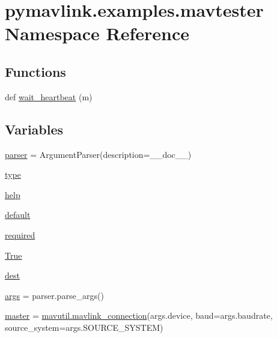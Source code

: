 \hypertarget{namespacepymavlink_1_1examples_1_1mavtester}{}\section{pymavlink.\+examples.\+mavtester Namespace Reference}
\label{namespacepymavlink_1_1examples_1_1mavtester}
\subsection*{Functions}
\begin{DoxyCompactItemize}
\item 
def \mbox{\hyperlink{namespacepymavlink_1_1examples_1_1mavtester_ae1bf609bf03b42c2ed744e90dbb30db3}{wait\+\_\+heartbeat}} (m)
\end{DoxyCompactItemize}
\subsection*{Variables}
\begin{DoxyCompactItemize}
\item 
\mbox{\hyperlink{namespacepymavlink_1_1examples_1_1mavtester_abaf020d3f161e1f0172b14362f3d36f5}{parser}} = Argument\+Parser(description=\+\_\+\+\_\+doc\+\_\+\+\_\+)
\item 
\mbox{\hyperlink{namespacepymavlink_1_1examples_1_1mavtester_a85d6cc5180b6d3cf95f36b44a8dcf832}{type}}
\item 
\mbox{\hyperlink{namespacepymavlink_1_1examples_1_1mavtester_ad6f1c83a2b98289aa750e955f0e05278}{help}}
\item 
\mbox{\hyperlink{namespacepymavlink_1_1examples_1_1mavtester_a9e36618a8bea3b749799ac0f0dcf9748}{default}}
\item 
\mbox{\hyperlink{namespacepymavlink_1_1examples_1_1mavtester_a8816d6500a50df4c5fc9a43197b27bc9}{required}}
\item 
\mbox{\hyperlink{namespacepymavlink_1_1examples_1_1mavtester_af775e6d2c46f681aea052a01b4c1ccd1}{True}}
\item 
\mbox{\hyperlink{namespacepymavlink_1_1examples_1_1mavtester_a61af7b708b0fd522f5830193b5941d68}{dest}}
\item 
\mbox{\hyperlink{namespacepymavlink_1_1examples_1_1mavtester_aaac9e510d5e48381c651f2742fa7cf15}{args}} = parser.\+parse\+\_\+args()
\item 
\mbox{\hyperlink{namespacepymavlink_1_1examples_1_1mavtester_a8d0f4641fe2b543e3064e11246fbea32}{master}} = \mbox{\hyperlink{namespacepymavlink_1_1mavutil_aa6c4b8861f86ef3bb746fa0fab241c93}{mavutil.\+mavlink\+\_\+connection}}(args.\+device, baud=args.\+baudrate, source\+\_\+system=args.\+S\+O\+U\+R\+C\+E\+\_\+\+S\+Y\+S\+T\+EM)
\end{DoxyCompactItemize}


